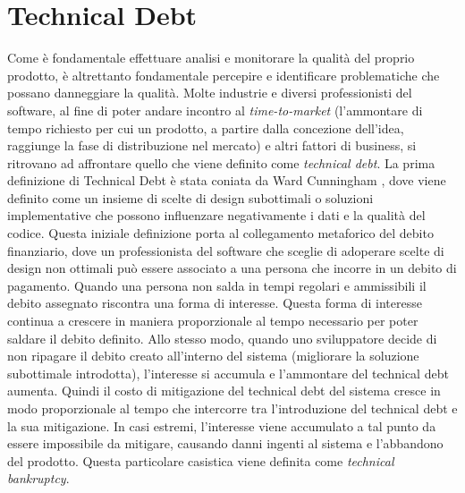 
\section{Technical Debt}
Come è fondamentale effettuare analisi e monitorare la qualità del proprio prodotto, è altrettanto fondamentale percepire e identificare problematiche che possano danneggiare la qualità.
Molte industrie e diversi professionisti del software, al fine di poter andare incontro al \textit{time-to-market} (\ie l'ammontare di tempo richiesto per cui un prodotto, a partire dalla concezione dell'idea, raggiunge la fase di distribuzione nel mercato) e altri fattori di business, si ritrovano ad affrontare quello che viene definito come \textit{technical debt}.
La prima definizione di Technical Debt è stata coniata da Ward Cunningham \cite{Cunningham1992td}, dove viene definito come un insieme di scelte di design subottimali o soluzioni implementative che possono influenzare negativamente i dati e la qualità del codice.
Questa iniziale definizione porta al collegamento metaforico del debito finanziario, dove un professionista del software che sceglie di adoperare scelte di design non ottimali può essere associato a una persona che incorre in un debito di pagamento. Quando una persona non salda in tempi regolari e ammissibili il debito assegnato riscontra una forma di interesse. Questa forma di interesse continua a crescere in maniera proporzionale al tempo necessario per poter saldare il debito definito.
Allo stesso modo, quando uno sviluppatore decide di non ripagare il debito creato all'interno del sistema (\ie migliorare la soluzione subottimale introdotta), l'interesse si accumula e l'ammontare del technical debt aumenta. Quindi il costo di mitigazione del technical debt del sistema cresce in modo proporzionale al tempo che intercorre tra l'introduzione del technical debt e la sua mitigazione.
In casi estremi, l'interesse viene accumulato a tal punto da essere impossibile da mitigare, causando danni ingenti al sistema e l'abbandono del prodotto.
Questa particolare casistica viene definita come \textit{technical bankruptcy}. \cite{refactoringSmellSuryanarayana}

